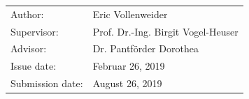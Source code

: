 \begin{titlepage}
	\vspace*{\fill}
	
	\normalsize
	\begin{flushleft}
		\begin{tabular}{l l}
			Author:					& Eric Vollenweider				\\[-0.1cm]
			Supervisor:     		& Prof. Dr.-Ing. Birgit Vogel-Heuser\\[-0.1cm]
			Advisor:				& Dr. Pantförder Dorothea\\[-0.1cm]
			Issue date:        		& {Februar 26, 2019} \\[-0.1cm]
			Submission date:        & {August 26, 2019} \\[-0.1cm]
		\end{tabular}
	\end{flushleft}
\end{titlepage}	